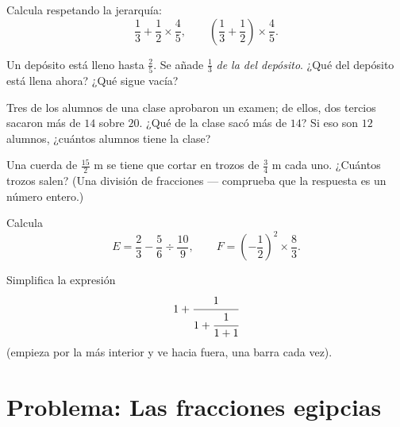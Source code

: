 \begin{exercise}[$\star$]\label{exo:g8:fractions:7}
Calcula respetando la jerarquía:
\[
\frac{1}{3} + \frac{1}{2} \times \frac{4}{5},
\qquad
\left(\frac{1}{3} + \frac{1}{2}\right) \times \frac{4}{5} .
\]
\end{exercise}

\begin{exercise}[$\star\star$]\label{exo:g8:fractions:8}
Un depósito está lleno hasta $\frac{2}{5}$. Se añade $\frac{1}{3}$ \emph{de la
 del depósito}. ¿Qué  del depósito está llena ahora? ¿Qué
 sigue vacía?
\end{exercise}

\begin{exercise}[$\star\star$]\label{exo:g8:fractions:9}
Tres  de los alumnos de una clase aprobaron un examen; de ellos,
dos tercios sacaron más de $14$ sobre $20$. ¿Qué  de la clase
sacó más de $14$? Si eso son $12$ alumnos, ¿cuántos alumnos tiene
la clase?
\end{exercise}

\begin{exercise}[$\star\star$]\label{exo:g8:fractions:10}
Una cuerda de $\frac{15}{2}$ m se tiene que cortar en trozos de $\frac{3}{4}$ m
cada uno. ¿Cuántos trozos salen? (Una división de fracciones ---
comprueba que la respuesta es un número entero.)
\end{exercise}

\begin{exercise}[$\star\star$]\label{exo:g8:fractions:11}
Calcula
\[
E = \frac{2}{3} - \frac{5}{6} \div \frac{10}{9},
\qquad
F = \left(-\frac{1}{2}\right)^2 \times \frac{8}{3} .
\]
\end{exercise}

\begin{exercise}[$\star\star\star$]\label{exo:g8:fractions:12}
Simplifica la expresión
\[
1 + \cfrac{1}{1 + \cfrac{1}{1 + 1}}
\]
(empieza por la  más interior y ve hacia fuera, una barra cada
vez).
\end{exercise}

\section{Problema: Las fracciones egipcias}

